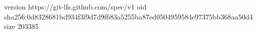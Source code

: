 version https://git-lfs.github.com/spec/v1
oid sha256:0d8328681bd934f3f9d7d9f683a5255ba87ed0504959584e97375bb368aa50d4
size 203385
